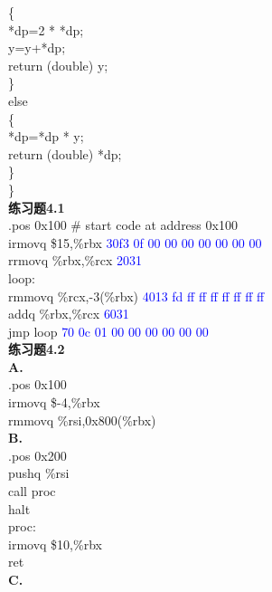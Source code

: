 \documentclass{article}
\newcommand{\blue}[1]{\textcolor{blue}{#1}}
\begin{document}
\begin{CJK}{UTF8}{uyhei}
	\hspace*{2em}\{		\\
	\hspace*{3em}*dp=2 * *dp;	\\
	\hspace*{3em}y=y+*dp;	\\
	\hspace*{3em}return (double) y;	\\
	\hspace*{2em}\}		\\
	\hspace*{2em}else	\\
	\hspace*{2em}\{		\\
	\hspace*{3em}*dp=*dp * y;	\\
	\hspace*{3em}return (double) *dp;	\\
	\hspace*{2em}\}		\\
\}	\\[3ex]
\textbf{练习题4.1}	\\
.pos 0x100 \# start code at address 0x100	\\
	\hspace*{1em}irmovq \$15,\%rbx	\blue{30f3 0f 00 00 00 00 00 00 00}\\
	\hspace*{1em}rrmovq \%rbx,\%rcx	\blue{2031}\\
loop:	\\
	\hspace*{1em}rmmovq \%rcx,-3(\%rbx)	\blue{4013 fd ff ff ff ff ff ff ff}\\
	\hspace*{1em}addq \%rbx,\%rcx	\blue{6031}\\
	\hspace*{1em}jmp loop	\blue{70 0c 01 00 00 00 00 00 00}\\[3ex]
\textbf{练习题4.2}	\\
\textbf{A.}	\\
.pos 0x100	\\
	\hspace*{1em}irmovq \$-4,\%rbx	\\
	\hspace*{1em}rmmovq \%rsi,0x800(\%rbx)	\\
\textbf{B.}	\\
.pos 0x200	\\
	\hspace*{1em}pushq \%rsi	\\
	\hspace*{1em}call proc	\\
	\hspace*{1em}halt		\\
proc:	\\
	\hspace*{1em}irmovq \$10,\%rbx	\\
	\hspace*{1em}ret		\\
\textbf{C.}	\\




\end{CJK}
\end{document}
